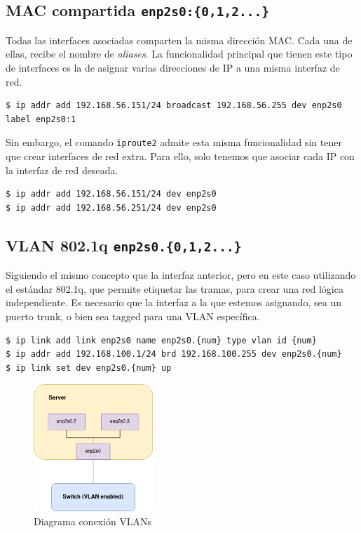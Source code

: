 \documentclass[12pt]{article}
\begin{document}
	\pagebreak
	
	\subsection{MAC compartida \texttt{enp2s0:\{0,1,2...\}}}
	\par \noindent Todas las interfaces asociadas comparten la misma dirección MAC. Cada una de ellas, recibe el nombre de \textit{aliases}. La funcionalidad principal que tienen este tipo de interfaces es la de asignar varias direcciones de IP a una misma interfaz de red.
	
	\begin{verbatim}
$ ip addr add 192.168.56.151/24 broadcast 192.168.56.255 dev enp2s0 
label enp2s0:1
	\end{verbatim}

	\par \noindent Sin embargo, el comando \texttt{iproute2} admite esta misma funcionalidad sin tener que crear interfaces de red extra. Para ello, solo tenemos que asociar cada IP con la interfaz de red deseada.
	\begin{verbatim}
$ ip addr add 192.168.56.151/24 dev enp2s0
$ ip addr add 192.168.56.251/24 dev enp2s0
	\end{verbatim}

	\subsection{VLAN 802.1q \texttt{enp2s0.\{0,1,2...\}}}
	\par \noindent Siguiendo el mismo concepto que la interfaz anterior, pero en este caso utilizando el estándar 802.1q, que permite etiquetar las tramas, para crear una red lógica independiente. Es necesario que la interfaz a la que estemos asignando, sea un puerto trunk, o bien sea tagged para una VLAN específica.
	
	\begin{verbatim}
$ ip link add link enp2s0 name enp2s0.{num} type vlan id {num}
$ ip addr add 192.168.100.1/24 brd 192.168.100.255 dev enp2s0.{num}
$ ip link set dev enp2s0.{num} up
	\end{verbatim}

	\begin{figure}[h!]
		\begin{center}
			\includegraphics[width=0.4\textwidth]{img/diag_vlan.png}
			\caption{Diagrama conexión VLANs}
		\end{center}
	\end{figure}
\end{document}
